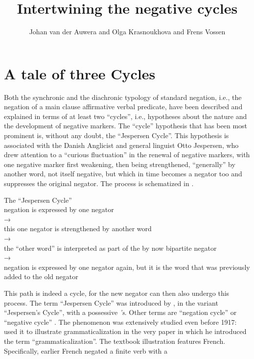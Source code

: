 ﻿\documentclass[output=paper]{langsci/langscibook}
\title{Intertwining the negative cycles}
\author{Johan van der Auwera\affiliation{University of Antwerp} and
Olga Krasnoukhova\affiliation{University of Antwerp} and
Frens Vossen\affiliation{University of Antwerp}
}
\begin{document}
\section{A tale of three Cycles}\label{sec:int-1}

Both the synchronic and the diachronic typology of standard negation, i.e.,
the negation of a main clause affirmative verbal predicate, have been
described and explained in terms of at least two ``cycles'', i.e., hypotheses
about the nature and the development of negative markers. The ``cycle''
hypothesis that has been most prominent is, without any doubt, the
``Jespersen Cycle''. This hypothesis is associated with the Danish Anglicist
and general linguist Otto Jespersen, who drew attention to a ``curious
fluctuation'' \parencite[4]{Jespersen1917} in the renewal of negative markers,
with one negative marker first weakening, then being strengthened,
``generally'' by another word, not itself negative, but which in time becomes
a negator too and suppresses the original negator. The process is
schematized in . 
%
\begin{exe}\ex\label{ex:int-jespersen}
          The ``Jespersen Cycle'' \\[1ex]
negation is expressed by one negator\\ 
→\\
this one negator is strengthened by another word\\ 
→\\ 
the ``other word'' is interpreted as part of the by now bipartite negator\\
→\\ 
negation is expressed by one negator again, but it is the word that was previously added to the old negator 
    \end{exe}
%
This path is indeed a cycle, for the new negator can then also undergo this
process. The term ``Jespersen Cycle'' was introduced by \textcite{Dahl1979}, in
the variant ``Jespersen's Cycle'', with a possessive \textit{'s}. Other
terms are ``negation cycle'' \parencite[e.g.][]{Schwegler1983} or ``negative
cycle'' \parencites(e.g.)(){Gelderen2011}{Mithun2016}. The
phenomenon was extensively studied even before 1917: \textcite{Meillet1912}
used it to illustrate grammaticalization in the very paper in which he
introduced the term ``grammaticalization''. The textbook illustration
features French. Specifically, earlier French negated a finite verb with a
\end{document}
